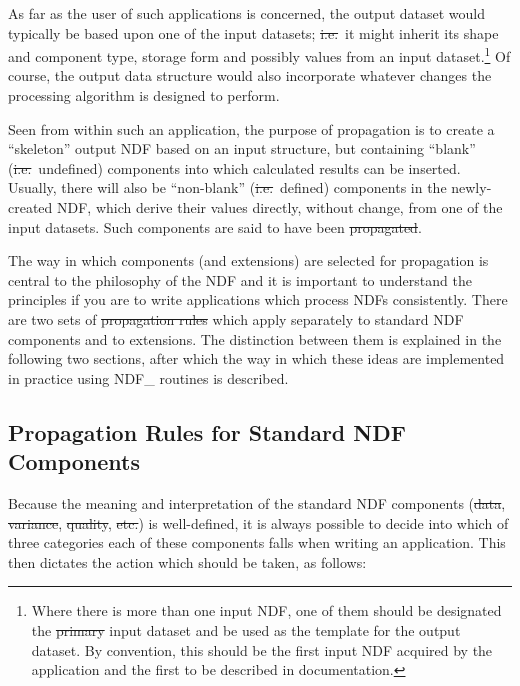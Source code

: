 As far as the user of such applications is concerned, the output dataset
would typically be based upon one of the input datasets; \st{i.e.}\ it might
inherit its shape and component type, storage form and possibly values from
an input dataset.\footnote{Where there is more than one input NDF, one of
them should be designated the \st{primary\/} input dataset and be used as the
template for the output dataset. By convention, this should be the first
input NDF acquired by the application and the first to be described in
documentation.} 
Of course, the output data structure would also incorporate whatever changes
the processing algorithm is designed to perform. 

Seen from within such an application, the purpose of propagation is to
create a ``skeleton'' output NDF based on an input structure, but containing
``blank'' (\st{i.e.}\ undefined) components into which calculated results
can be inserted. 
Usually, there will also be ``non-blank'' (\st{i.e.}\ defined) components
in the newly-created NDF, which derive their values directly, without
change, from one of the input datasets. 
Such components are said to have been \st{propagated}.

The way in which components (and extensions) are selected for propagation is
central to the philosophy of the NDF and it is important to understand the 
principles if you are to write applications which process NDFs consistently.
There are two sets of \st{propagation rules\/} which apply separately to
standard NDF components and to extensions. 
The distinction between them is explained in the following two sections,
after which the way in which these ideas are implemented in practice using 
NDF\_ routines is described. 

\subsection{\label{ss:propstandard}Propagation Rules for Standard NDF Components}

Because the meaning and interpretation of the standard NDF components
(\st{data}, \st{variance}, \st{quality}, \st{etc.}) is
well-defined, it is always 
possible to decide into which of three categories each of these components falls
when writing an application. 
This then dictates the action which should be taken, as follows:

